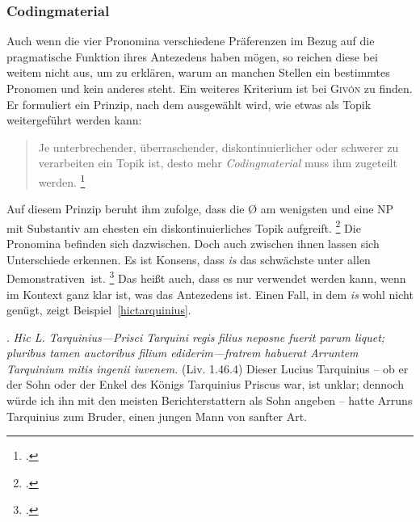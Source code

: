 \documentclass[12pt]{article}
\newcommand{\lat}[1]{\textit{#1}} %
\newcommand{\cntrl}[1]{#1} %
\begin{document}
\subsubsection{Codingmaterial}
\label{coding}

Auch wenn die vier Pronomina verschiedene Präferenzen im Bezug auf die pragmatische Funktion ihres Antezedens haben mögen, so reichen diese bei weitem nicht aus, um zu erklären, warum an manchen Stellen ein bestimmtes Pronomen und kein anderes steht.
Ein weiteres Kriterium ist bei \textsc{Givón} zu finden. Er formuliert ein Prinzip, nach dem ausgewählt wird, wie etwas als Topik weitergeführt werden kann:

\begin{quote}
Je unterbrechender, überraschender, diskontinuierlicher oder schwerer zu verarbeiten ein Topik ist, desto mehr \emph{\cntrl{Codingmaterial}} muss ihm \cntrl{zugeteilt} werden.
\footcite[``The more disruptive, surprising, discontinuous or hard to process a Topic is, the more \emph{coding material} must be assigned to it.'' Ursprüngliche Hervorhebung.][hier S.\,18]{givon}
\end{quote}

\noindent Auf diesem Prinzip beruht ihm zufolge, dass die Ø am wenigsten und eine NP mit Substantiv am ehesten ein diskontinuierliches Topik aufgreift.
\footcite[hier S.\,18]{givon}
Die Pronomina befinden sich dazwischen. Doch auch zwischen ihnen lassen sich Unterschiede erkennen.
Es ist Konsens, dass \lat{is} \glqq das schwächste unter allen Demonstrativen\grqq\ ist.
\footcite[§\,118, Punkt 1.]{kuehner}
Das heißt auch, dass es nur verwendet werden kann, wenn im Kontext ganz klar ist, was das Antezedens ist. Einen Fall, in dem \lat{is} wohl nicht genügt, zeigt Beispiel~\ref{hictarquinius}.

\ex.
\label{hictarquinius}
\lat{Hic L. Tarquinius---Prisci Tarquini regis filius neposne fuerit parum liquet; pluribus tamen auctoribus filium ediderim---fratrem habuerat Arruntem Tarquinium mitis ingenii iuvenem.} (Liv. 1.46.4)
\trans Dieser Lucius Tarquinius -- ob er der Sohn oder der Enkel des Königs Tarquinius Priscus war, ist unklar; dennoch würde ich ihn mit den meisten Berichterstattern als Sohn angeben -- hatte Arruns Tarquinius zum Bruder, einen jungen Mann von sanfter Art.
\end{document}
